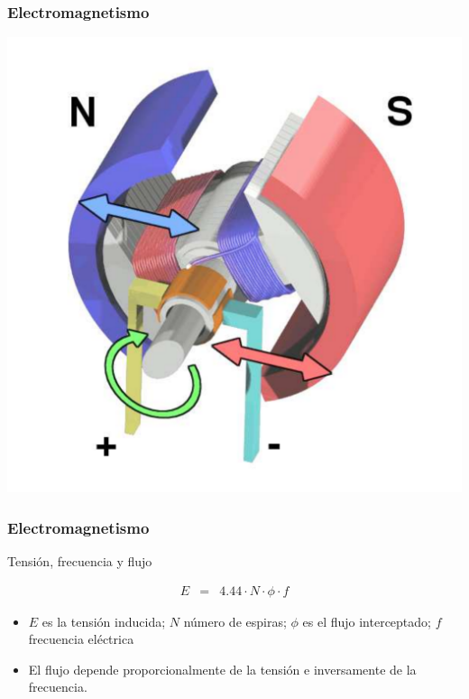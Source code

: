 \documentclass[serif, xcolor=dvipsnames]{beamer}
\begin{document}
\begin{frame}[plain]
  \frametitle{Electromagnetismo}

  \begin{center}
    \includegraphics[scale=0.4]{../figs/Electric_motor_cycle_3}
    \par\end{center}


\end{frame}
\begin{frame}
  \frametitle{Electromagnetismo}
  \begin{block} {Tensión, frecuencia y flujo}

\begin{eqnarray*}
  E & = & 4.44\cdot N\cdot\phi\cdot f
\end{eqnarray*}

\begin{itemize}
\item $E$ es la tensión inducida; $N$ número de espiras; $\phi$ es el
  flujo interceptado; $f$ frecuencia eléctrica
\item El flujo depende proporcionalmente de la tensión e inversamente
  de la frecuencia.
\end{itemize}
\end{block}

\end{frame}
\end{document}
